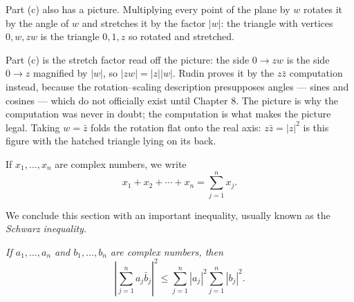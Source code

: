 \begin{deeper}
Part (c) also has a picture. Multiplying every point of the plane by $w$
rotates it by the angle of $w$ and stretches it by the factor $|w|$: the
triangle with vertices $0, w, zw$ is the triangle $0, 1, z$ so rotated and
stretched.

\medskip
\begin{center}
\end{center}

\smallskip
Part (c) is the stretch factor read off the picture: the side $0 \to zw$ is
the side $0 \to z$ magnified by $|w|$, so $|zw| = |z||w|$. Rudin proves it by
the $z\bar z$ computation instead, because the rotation--scaling description
presupposes angles --- sines and cosines --- which do not officially exist
until Chapter 8. The picture is why the computation was never in doubt; the
computation is what makes the picture legal. Taking $w = \bar z$ folds the
rotation flat onto the real axis: $z\bar z = |z|^2$ is this figure with the
hatched triangle lying on its back.
\end{deeper}

If $x_1, \dots, x_n$ are complex numbers, we write
\[ x_1 + x_2 + \cdots + x_n = \sum_{j=1}^n x_j. \]

We conclude this section with an important inequality, usually known as the
\emph{Schwarz inequality}.

\emph{If $a_1,\dots,a_n$ and $b_1,\dots,b_n$ are complex numbers, then}
\[ \left|\sum_{j=1}^n a_j\bar b_j\right|^2 \le
   \sum_{j=1}^n |a_j|^2 \sum_{j=1}^n |b_j|^2. \]

